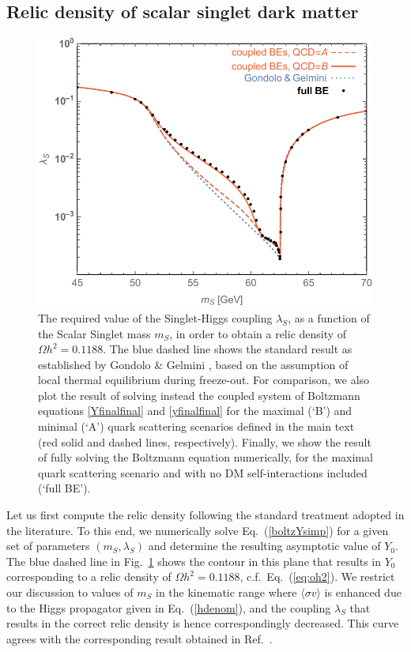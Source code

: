 \documentclass[twocolumn,showpacs,amsmath,amssymb,superscriptaddress,nofootinbib]{revtex4-1}
\begin{document}
\subsection{Relic density of scalar singlet dark matter}
\label{sec:singlet_rd}

\begin{figure}[t!]
  \includegraphics[width=0.9\columnwidth]{RD_contour_AB_Drees}
  \caption{The required value of the Singlet-Higgs coupling $\lambda_S$, as a function of the Scalar 
  Singlet mass $m_S$, in order to obtain a relic density of  $\Omega h^2=0.1188$.  The blue dashed
  line shows the standard result as established by Gondolo \& Gelmini \cite{Gondolo:1990dk}, based 
  on the assumption of local thermal equilibrium during freeze-out. 
  For comparison, we also plot the result of solving instead the coupled system of Boltzmann equations 
  \eqref{Yfinalfinal} and \eqref{yfinalfinal} for the maximal (`B') and minimal (`A') quark scattering scenarios 
  defined in the main text (red solid and dashed lines, respectively). Finally, we show the result of fully solving
 the Boltzmann equation numerically, for the maximal quark scattering scenario and with no DM self-interactions 
 included (`full BE').
  }
    \label{fig:RDcont1}
\end{figure}

Let us first compute the relic density following the standard treatment adopted in the literature. 
To this end, we numerically solve Eq.~(\ref{boltzYsimp}) for a given set of parameters $(m_S,\lambda_S)$ 
and determine the resulting asymptotic value of $Y_0$. The blue dashed line in Fig.~\ref{fig:RDcont1} 
shows the contour in this plane that results in $Y_0$ corresponding to a relic density of 
$\Omega h^2=0.1188$, c.f.~Eq.~(\ref{eq:oh2}).
We restrict our discussion to values of $m_S$ in the kinematic range where $\langle \sigma v\rangle$ is 
enhanced due to the Higgs propagator given in Eq.~(\ref{hdenom}), and
the coupling $\lambda_S$ that results in the correct relic density is hence correspondingly decreased.
This curve agrees with the corresponding result obtained in Ref.~\cite{Cline:2013gha}. 
\end{document}
